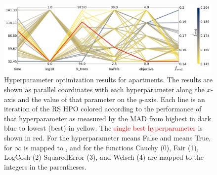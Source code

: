 \begin{figure}
  \centerfloat
  \includegraphics[width=0.99\textwidth, trim=0 0 0 0, clip]{figures/housing/Ejerlejlighed_v19_cut_all_Ncols_all_CV_viz_initial_HPO.pdf}
  \caption[Parallel Coordinate Plot of the Initial Hyperparameter Optimization for Apartments]
          {Hyperparameter optimization results for apartments. The results are shown as parallel coordinates with each hyperparameter along the $x$-axis and the value of that parameter on the $y$-axis. Each line is an iteration of the RS HPO colored according to the performance of that hyperparameter as measured by the MAD from \textcolor{viridis-dark}{highest} in dark blue to \textcolor{viridis-light}{lowest (best)} in yellow. The \textcolor{red}{single best hyperparameter} is shown in red. For the hyperparameter   means False and  means True, for  $\infty$ is mapped to , and for  the functions Cauchy (0), Fair (1), LogCosh (2) SquaredError (3), and Welsch (4) are mapped to the integers in the parentheses.
          } 
  \label{fig:h:initial_CV_res_parallel_coords_ejer}
\end{figure}

